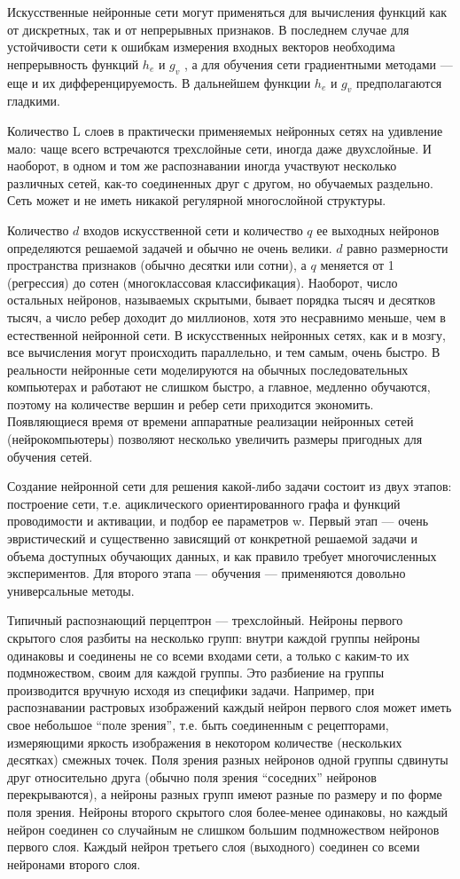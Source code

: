 Искусственные нейронные сети могут применяться для вычисления функций как от
дискретных, так и от непрерывных признаков. В последнем случае для устойчивости
сети к ошибкам измерения входных векторов необходима непрерывность функций $h_e$
и $g_v$ , а для обучения сети градиентными методами — еще и их
дифференцируемость. В дальнейшем функции $h_e$ и $g_v$ предполагаются гладкими.


Количество L слоев в практически применяемых нейронных сетях на удивление мало:
чаще всего встречаются трехслойные сети, иногда даже двухслойные. И наоборот, в
одном и том же распознавании иногда участвуют несколько различных сетей, как-то
соединенных друг с другом, но обучаемых раздельно. Сеть может и не иметь никакой
регулярной многослойной структуры.


Количество $d$ входов искусственной сети и количество $q$ ее выходных нейронов
определяются решаемой задачей и обычно не очень велики. $d$ равно размерности
пространства признаков (обычно десятки или сотни), а $q$ меняется от 1
(регрессия) до сотен (многоклассовая классификация). Наоборот, число остальных
нейронов, называемых скрытыми, бывает порядка тысяч и десятков тысяч, а число
ребер доходит до миллионов, хотя это несравнимо меньше, чем в естественной
нейронной сети. В искусственных нейронных сетях, как и в мозгу, все вычисления
могут происходить параллельно, и тем самым, очень быстро. В реальности нейронные
сети моделируются на обычных последовательных компьютерах и работают не слишком
быстро, а главное, медленно обучаются, поэтому на количестве вершин и ребер сети
приходится экономить. Появляющиеся время от времени аппаратные реализации
нейронных сетей (нейрокомпьютеры) позволяют несколько увеличить размеры
пригодных для обучения сетей.


Создание нейронной сети для решения какой-либо задачи состоит из двух этапов:
построение сети, т.е. ациклического ориентированного графа и функций
проводимости и активации, и подбор ее параметров w. Первый этап — очень
эвристический и существенно зависящий от конкретной решаемой задачи и объема
доступных обучающих данных, и как правило требует многочисленных
экспериментов. Для второго этапа — обучения — применяются довольно универсальные
методы.


Типичный распознающий перцептрон — трехслойный. Нейроны первого скрытого слоя
разбиты на несколько групп: внутри каждой группы нейроны одинаковы и соединены
не со всеми входами сети, а только с каким-то их подмножеством, своим для каждой
группы. Это разбиение на группы производится вручную исходя из специфики
задачи. Например, при распознавании растровых изображений каждый нейрон первого
слоя может иметь свое небольшое “поле зрения”, т.е. быть соединенным с
рецепторами, измеряющими яркость изображения в некотором количестве (нескольких
десятках) смежных точек. Поля зрения разных нейронов одной группы сдвинуты друг
относительно друга (обычно поля зрения “соседних” нейронов перекрываются), а
нейроны разных групп имеют разные по размеру и по форме поля зрения. Нейроны
второго скрытого слоя более-менее одинаковы, но каждый нейрон соединен со
случайным не слишком большим подмножеством нейронов первого слоя. Каждый нейрон
третьего слоя (выходного) соединен со всеми нейронами второго слоя.

